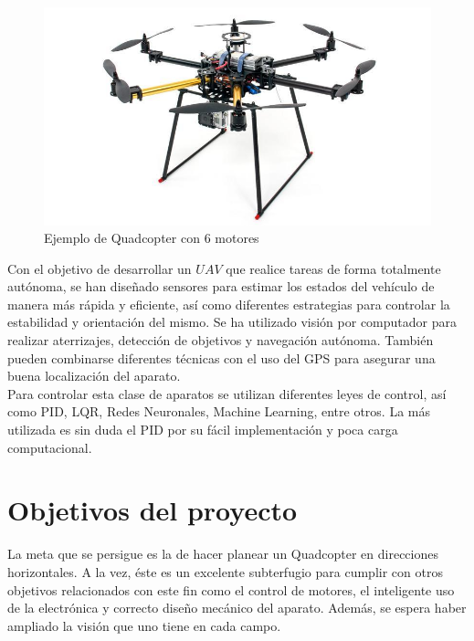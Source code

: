 \documentclass[twoside,11pt]{book}
\begin{document}
\begin{figure}[h!]
\begin{center}
\includegraphics[scale=0.3,bb=0 0 650 350]{images/6_armed_quadcopter.png}
\caption{Ejemplo de Quadcopter con 6 motores}
\end{center}
\end{figure}

Con el objetivo de desarrollar un $UAV$ que realice tareas de forma totalmente autónoma, se han diseñado sensores para estimar los estados del vehículo de manera más rápida y eficiente, así como diferentes estrategias para controlar la estabilidad y orientación del mismo. Se ha utilizado visión  por computador para realizar aterrizajes, detección de objetivos y navegación autónoma. También pueden combinarse diferentes técnicas con el uso del GPS para asegurar una buena localización del aparato. \\

Para controlar esta clase de aparatos se utilizan diferentes leyes de control, así como PID, LQR, Redes Neuronales, Machine Learning, entre otros. La más utilizada es sin duda el PID por su fácil implementación y poca carga computacional.

\section{Objetivos del proyecto}

La meta que se persigue es la de hacer planear un Quadcopter en direcciones horizontales. A la vez, éste es un excelente subterfugio para cumplir con otros objetivos relacionados con este fin como el control de motores, el inteligente uso de la electrónica y correcto diseño mecánico del aparato. Además, se espera haber ampliado la visión que uno tiene en cada campo. \\
\end{document}
